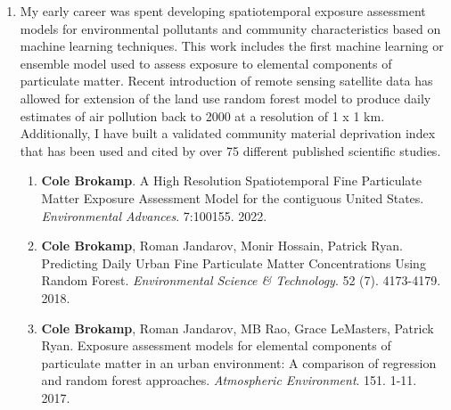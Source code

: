 \documentclass{nihbiosketch}
\begin{document}
\begin{enumerate}

\item My early career was spent developing spatiotemporal exposure assessment models for
  environmental pollutants and community characteristics based on machine learning
  techniques.  This work includes the first machine
  learning or ensemble model used to assess exposure to elemental components of
  particulate matter. Recent introduction of remote sensing satellite data has
  allowed for extension of the land use random forest model to produce daily
  estimates of air pollution back to 2000 at a resolution of 1 x 1 km. Additionally,
  I have built a validated community material deprivation index that has been used and cited
  by over 75 different published scientific studies.

\begin{enumerate}

  \item \textbf{Cole Brokamp}. A High Resolution Spatiotemporal Fine Particulate Matter Exposure Assessment Model for the contiguous United States. \textit{Environmental Advances}. 7:100155. 2022.

  \item \textbf{Cole Brokamp}, Roman Jandarov, Monir Hossain, Patrick Ryan. Predicting Daily Urban Fine Particulate Matter Concentrations Using Random Forest. \textit{Environmental Science \& Technology}. 52 (7). 4173-4179. 2018.

  \item \textbf{Cole Brokamp}, Roman Jandarov, MB Rao, Grace LeMasters, Patrick Ryan. Exposure assessment models for elemental components of particulate matter in an urban environment: A comparison of regression and random forest approaches. \textit{Atmospheric Environment}. 151. 1-11. 2017.




\end{enumerate}
\end{enumerate}
\end{document}
